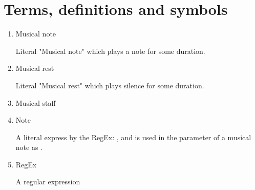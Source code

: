 \section{Terms, definitions and symbols}

\begin{enumerate}
\item Musical note

Literal "Musical note" which plays a note for some duration.

\item Musical rest

Literal "Musical rest" which plays silence for some duration.

\item Musical staff

\item Note

A literal express by the RegEx: \protect{}, and is used
in the parameter of a musical note as .

\item RegEx

A regular expression
\end{enumerate}

